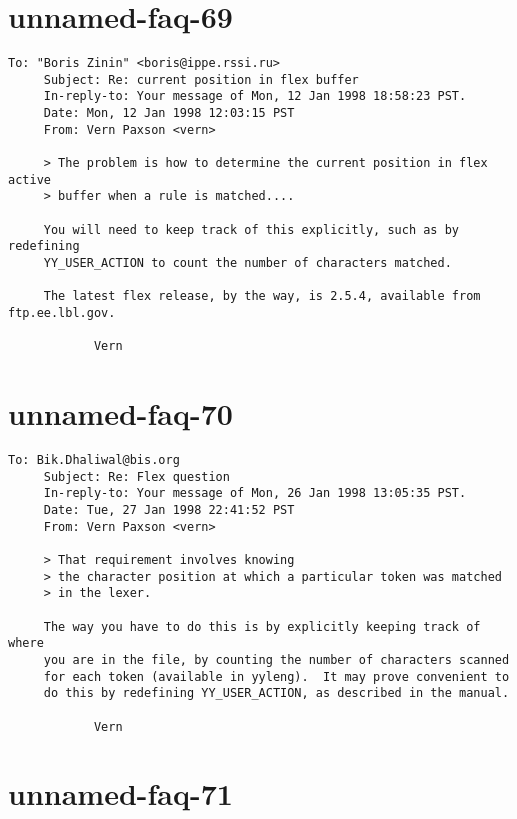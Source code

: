 \documentclass[openany,oneside]{book}
\begin{document}
\section{unnamed-faq-69}

\begin{verbatim}
To: "Boris Zinin" <boris@ippe.rssi.ru>
     Subject: Re: current position in flex buffer
     In-reply-to: Your message of Mon, 12 Jan 1998 18:58:23 PST.
     Date: Mon, 12 Jan 1998 12:03:15 PST
     From: Vern Paxson <vern>
     
     > The problem is how to determine the current position in flex active
     > buffer when a rule is matched....
     
     You will need to keep track of this explicitly, such as by redefining
     YY_USER_ACTION to count the number of characters matched.
     
     The latest flex release, by the way, is 2.5.4, available from ftp.ee.lbl.gov.
     
     		Vern
\end{verbatim}

\section{unnamed-faq-70}

\begin{verbatim}
To: Bik.Dhaliwal@bis.org
     Subject: Re: Flex question
     In-reply-to: Your message of Mon, 26 Jan 1998 13:05:35 PST.
     Date: Tue, 27 Jan 1998 22:41:52 PST
     From: Vern Paxson <vern>
     
     > That requirement involves knowing
     > the character position at which a particular token was matched
     > in the lexer.
     
     The way you have to do this is by explicitly keeping track of where
     you are in the file, by counting the number of characters scanned
     for each token (available in yyleng).  It may prove convenient to
     do this by redefining YY_USER_ACTION, as described in the manual.
     
     		Vern
\end{verbatim}

\section{unnamed-faq-71}
\end{document}
